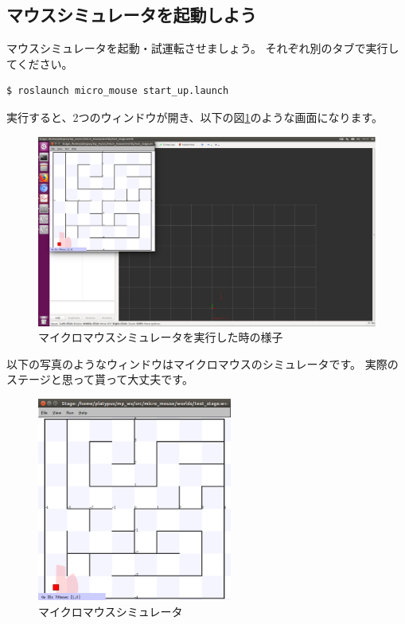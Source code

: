 \documentclass[11pt,a4paper]{jsarticle}
\begin{document}
\newpage
\subsection{マウスシミュレータを起動しよう}
マウスシミュレータを起動・試運転させましょう。
それぞれ別のタブで実行してください。
\begin{lstlisting}[frame=single]
$ roslaunch micro_mouse start_up.launch
\end{lstlisting}

実行すると、2つのウィンドウが開き、以下の図\ref{mms_startup}のような画面になります。
\begin{figure}[h]
  \begin{center}
    \includegraphics[width=128mm]{./mms_startup.png}
  \end{center}
  \label{mms_startup}
  \caption{マイクロマウスシミュレータを実行した時の様子}
\end{figure}

以下の写真のようなウィンドウはマイクロマウスのシミュレータです。
実際のステージと思って貰って大丈夫です。
\begin{figure}[h]
  \begin{center}
    \includegraphics[width=64mm]{./mms_simulator.png}
  \end{center}
  \label{mms_simulator}
  \caption{マイクロマウスシミュレータ}
\end{figure}
\end{document}
